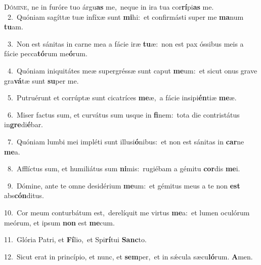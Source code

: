 \lettrine{\initial\textcolor{\initialcolor}{D}}{ómine,} ne in furóre tuo árgu\textbf{as} me,~\star neque in ira tua cor\-\textbf{rí}\-pi\textbf{as} me.\\
{\numbfont\textcolor{\numbcolor}{~2.}}~Quóniam sagíttæ tuæ infíxæ sunt \textbf{mi}\-hi:~\star et confirmásti super me \textbf{ma}\-num \textbf{tu}\-am.\par
{\numbfont\textcolor{\numbcolor}{~3.}}~Non est sánitas in carne mea a fácie iræ \textbf{tu}\-æ:~\star non est pax óssibus meis a fácie pecca\-\textbf{tó}\-rum me\-\textbf{ó}\-rum.\par
{\numbfont\textcolor{\numbcolor}{~4.}}~Quóniam iniquitátes meæ supergréssæ sunt caput \textbf{me}\-um:~\star et sicut onus grave gra\-\textbf{vá}\-tæ sunt \textbf{su}\-per me.\par
{\numbfont\textcolor{\numbcolor}{~5.}}~Putruérunt et corrúptæ sunt cicatríces \textbf{me}\-æ,~\star a fácie insipi\-\textbf{én}\-tiæ \textbf{me}\-æ.\par
{\numbfont\textcolor{\numbcolor}{~6.}}~Miser factus sum, et curvátus sum usque in \textbf{fi}\-nem:~\star tota die contristátus in\-\textbf{gre}\-di\-\textbf{é}\-bar.\par
{\numbfont\textcolor{\numbcolor}{~7.}}~Quóniam lumbi mei impléti sunt illusi\-\textbf{ó}\-nibus:~\star et non est sánitas in \textbf{car}\-ne \textbf{me}\-a.\par
{\numbfont\textcolor{\numbcolor}{~8.}}~Afflíctus sum, et humiliátus sum \textbf{ni}\-mis:~\star rugiébam a gémitu \textbf{cor}\-dis \textbf{me}\-i.\par
{\numbfont\textcolor{\numbcolor}{~9.}}~Dómine, ante te omne desidérium \textbf{me}\-um:~\star et gémitus meus a te non \textbf{est} abs\-\textbf{cón}\-ditus.\par
{\numbfont\textcolor{\numbcolor}{10.}}~Cor meum conturbátum est,~\dagger derelíquit me virtus \textbf{me}\-a:~\star et lumen oculórum meórum, et ipsum \textbf{non} est \textbf{me}\-cum.\par
{\numbfont\textcolor{\numbcolor}{11.}}~Glória Patri, et \textbf{Fí}\-lio,~\star et Spi\-\textbf{rí}\-tui \textbf{Sanc}\-to.\par
{\numbfont\textcolor{\numbcolor}{12.}}~Sicut erat in princípio, et nunc, et \textbf{sem}\-per,~\star et in sǽcula sæcu\-\textbf{ló}\-rum. \textbf{A}\-men.\par
